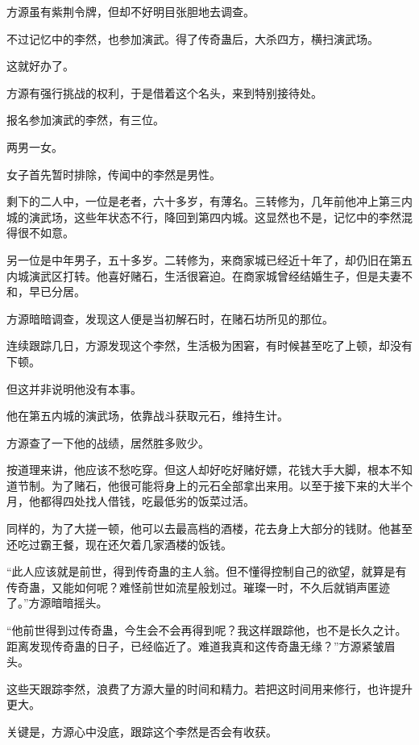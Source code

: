 
\begin{this_body}

方源虽有紫荆令牌，但却不好明目张胆地去调查。

不过记忆中的李然，也参加演武。得了传奇蛊后，大杀四方，横扫演武场。

这就好办了。

方源有强行挑战的权利，于是借着这个名头，来到特别接待处。

报名参加演武的李然，有三位。

两男一女。

女子首先暂时排除，传闻中的李然是男性。

剩下的二人中，一位是老者，六十多岁，有薄名。三转修为，几年前他冲上第三内城的演武场，这些年状态不行，降回到第四内城。这显然也不是，记忆中的李然混得很不如意。

另一位是中年男子，五十多岁。二转修为，来商家城已经近十年了，却仍旧在第五内城演武区打转。他喜好赌石，生活很窘迫。在商家城曾经结婚生子，但是夫妻不和，早已分居。

方源暗暗调查，发现这人便是当初解石时，在赌石坊所见的那位。

连续跟踪几日，方源发现这个李然，生活极为困窘，有时候甚至吃了上顿，却没有下顿。

但这并非说明他没有本事。

他在第五内城的演武场，依靠战斗获取元石，维持生计。

方源查了一下他的战绩，居然胜多败少。

按道理来讲，他应该不愁吃穿。但这人却好吃好赌好嫖，花钱大手大脚，根本不知道节制。为了赌石，他很可能将身上的元石全部拿出来用。以至于接下来的大半个月，他都得四处找人借钱，吃最低劣的饭菜过活。

同样的，为了大搓一顿，他可以去最高档的酒楼，花去身上大部分的钱财。他甚至还吃过霸王餐，现在还欠着几家酒楼的饭钱。

“此人应该就是前世，得到传奇蛊的主人翁。但不懂得控制自己的欲望，就算是有传奇蛊，又能如何呢？难怪前世如流星般划过。璀璨一时，不久后就销声匿迹了。”方源暗暗摇头。

“他前世得到过传奇蛊，今生会不会再得到呢？我这样跟踪他，也不是长久之计。距离发现传奇蛊的日子，已经临近了。难道我真和这传奇蛊无缘？”方源紧皱眉头。

这些天跟踪李然，浪费了方源大量的时间和精力。若把这时间用来修行，也许提升更大。

关键是，方源心中没底，跟踪这个李然是否会有收获。


\end{this_body}
